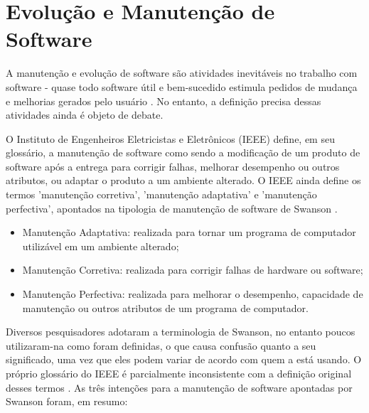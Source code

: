 \section{Evolução e Manutenção de Software}



A manutenção e evolução de software são atividades inevitáveis no trabalho com software - 
quase todo software útil e bem-sucedido estimula pedidos de mudança e melhorias gerados pelo usuário \cite{bennett2000software}. 
No entanto, a definição precisa dessas atividades ainda é objeto de debate.

O Instituto de Engenheiros Eletricistas e Eletrônicos (IEEE) define, em seu glossário, 
a manutenção de software como sendo a modificação de um produto de software após a entrega para 
corrigir falhas, melhorar desempenho ou outros atributos, ou adaptar o produto a um ambiente alterado. 
O IEEE ainda define os termos 'manutenção corretiva', 'manutenção adaptativa' e 'manutenção perfectiva', 
apontados na tipologia de manutenção de software de Swanson \cite{1990IEEESGo, swanson1976dimensions}.

\begin{itemize}
    \item Manutenção Adaptativa: realizada para tornar um programa de computador utilizável em um ambiente alterado;
    \item Manutenção Corretiva: realizada para corrigir falhas de hardware ou software;
    \item Manutenção Perfectiva: realizada para melhorar o desempenho, capacidade de manutenção ou outros atributos de um programa de computador.
\end{itemize}

Diversos pesquisadores adotaram a terminologia de Swanson, no entanto poucos utilizaram-na como foram 
definidas, o que causa confusão quanto a seu significado, uma vez que eles podem variar de acordo com 
quem a está usando. O próprio glossário do IEEE é parcialmente inconsistente com a definição original 
desses termos \cite{chapin2001types}. As três intenções para a manutenção de software 
apontadas por Swanson foram, em resumo:

